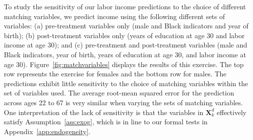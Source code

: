 \noindent To study the sensitivity of our labor income predictions to the choice of different matching variables, we predict income using the following different sets of variables: (a) pre-treatment variables only (male and Black indicators and year of birth); (b) post-treatment variables only (years of education at age 30 and labor income at age 30); and (c) pre-treatment and post-treatment variables (male and Black indicators, year of birth, years of education at age 30, and labor income at age 30). Figure~\ref{fig:matchvariables} displays the results of this exercise. The top row represents the exercise for females and the bottom row for males. The predictions exhibit little sensitivity to the choice of matching variables within the set of variables used. The average root-mean squared error for the prediction across ages 22 to 67 is very similar when varying the sets of matching variables.\\

\noindent One interpretation of the lack of sensitivity is that the variables in $\bm{X}^d_{k}$ effectively satisfy Assumption~\ref{ass:exog}, which is in line to our formal tests in Appendix~\ref{app:endogeneity}.

